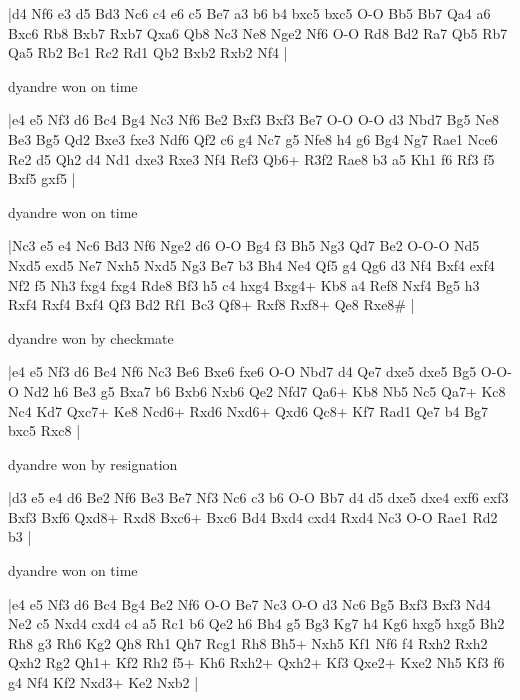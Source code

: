 \makegametitle
|d4 Nf6 e3 d5 Bd3 Nc6 c4 e6 c5 Be7 a3 b6 b4 bxc5 bxc5 O-O Bb5 Bb7 Qa4 a6 Bxc6 Rb8 Bxb7 Rxb7 Qxa6 Qb8 Nc3 Ne8 Nge2 Nf6 O-O Rd8 Bd2 Ra7 Qb5 Rb7 Qa5 Rb2 Bc1 Rc2 Rd1 Qb2 Bxb2 Rxb2 Nf4  |

\showboard

dyandre won on time

\makegametitle
|e4 e5 Nf3 d6 Bc4 Bg4 Nc3 Nf6 Be2 Bxf3 Bxf3 Be7 O-O O-O d3 Nbd7 Bg5 Ne8 Be3 Bg5 Qd2 Bxe3 fxe3 Ndf6 Qf2 c6 g4 Nc7 g5 Nfe8 h4 g6 Bg4 Ng7 Rae1 Nce6 Re2 d5 Qh2 d4 Nd1 dxe3 Rxe3 Nf4 Ref3 Qb6+ R3f2 Rae8 b3 a5 Kh1 f6 Rf3 f5 Bxf5 gxf5  |

\showboard

dyandre won on time

\makegametitle
|Nc3 e5 e4 Nc6 Bd3 Nf6 Nge2 d6 O-O Bg4 f3 Bh5 Ng3 Qd7 Be2 O-O-O Nd5 Nxd5 exd5 Ne7 Nxh5 Nxd5 Ng3 Be7 b3 Bh4 Ne4 Qf5 g4 Qg6 d3 Nf4 Bxf4 exf4 Nf2 f5 Nh3 fxg4 fxg4 Rde8 Bf3 h5 c4 hxg4 Bxg4+ Kb8 a4 Ref8 Nxf4 Bg5 h3 Rxf4 Rxf4 Bxf4 Qf3 Bd2 Rf1 Bc3 Qf8+ Rxf8 Rxf8+ Qe8 Rxe8\#  |

\showboard

dyandre won by checkmate

\makegametitle
|e4 e5 Nf3 d6 Bc4 Nf6 Nc3 Be6 Bxe6 fxe6 O-O Nbd7 d4 Qe7 dxe5 dxe5 Bg5 O-O-O Nd2 h6 Be3 g5 Bxa7 b6 Bxb6 Nxb6 Qe2 Nfd7 Qa6+ Kb8 Nb5 Nc5 Qa7+ Kc8 Nc4 Kd7 Qxc7+ Ke8 Ncd6+ Rxd6 Nxd6+ Qxd6 Qc8+ Kf7 Rad1 Qe7 b4 Bg7 bxc5 Rxc8  |

\showboard

dyandre won by resignation

\makegametitle
|d3 e5 e4 d6 Be2 Nf6 Be3 Be7 Nf3 Nc6 c3 b6 O-O Bb7 d4 d5 dxe5 dxe4 exf6 exf3 Bxf3 Bxf6 Qxd8+ Rxd8 Bxc6+ Bxc6 Bd4 Bxd4 cxd4 Rxd4 Nc3 O-O Rae1 Rd2 b3  |

\showboard

dyandre won on time

\makegametitle
|e4 e5 Nf3 d6 Bc4 Bg4 Be2 Nf6 O-O Be7 Nc3 O-O d3 Nc6 Bg5 Bxf3 Bxf3 Nd4 Ne2 c5 Nxd4 cxd4 c4 a5 Rc1 b6 Qe2 h6 Bh4 g5 Bg3 Kg7 h4 Kg6 hxg5 hxg5 Bh2 Rh8 g3 Rh6 Kg2 Qh8 Rh1 Qh7 Rcg1 Rh8 Bh5+ Nxh5 Kf1 Nf6 f4 Rxh2 Rxh2 Qxh2 Rg2 Qh1+ Kf2 Rh2 f5+ Kh6 Rxh2+ Qxh2+ Kf3 Qxe2+ Kxe2 Nh5 Kf3 f6 g4 Nf4 Kf2 Nxd3+ Ke2 Nxb2  |


